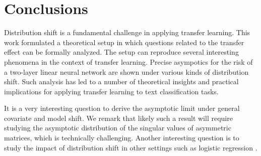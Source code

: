 \section{Conclusions}\label{sec_conclude}

Distribution shift is a fundamental challenge in applying transfer learning.
This work formulated a theoretical setup in which questions related to the transfer effect can be formally analyzed.
The setup can reproduce several interesting phenomena in the context of transfer learning.
Precise asympotics for the risk of a two-layer linear neural network are shown under various kinds of distribution shift.
Such analysis has led to a number of theoretical insights and practical implications for applying transfer learning to text classification tasks.

It is a very interesting question to derive the asymptotic limit under general covariate and model shift.
We remark that likely such a result will require studying the asymptotic distribution of the singular values of asymmetric matrices, which is technically challenging.
Another interesting question is to study the impact of distribution shift in other settings such as logistic regression \cite{sur2019modern}.

